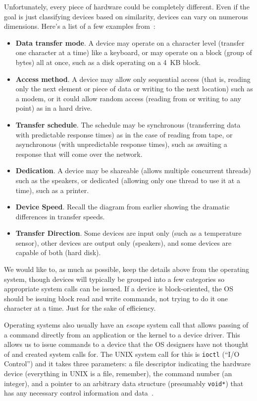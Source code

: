 Unfortunately, every piece of hardware could be completely different. Even if the goal is just classifying devices based on similarity, devices can vary on numerous dimensions. Here's a list of a few examples from~\cite{osc}:

\begin{itemize}
\item \textbf{Data transfer mode}. A device may operate on a character level (transfer one character at a time) like a keyboard, or may operate on a block (group of bytes) all at once, such as a disk operating on a 4~KB block.
\item \textbf{Access method}. A device may allow only sequential access (that is, reading only the next element or piece of data or writing to the next location) such as a modem, or it could allow random access (reading from or writing to any point) as in a hard drive.
\item \textbf{Transfer schedule}. The schedule may be synchronous (transferring data with predictable response times) as in the case of reading from tape, or asynchronous (with unpredictable response times), such as awaiting a response that will come over the network.
\item \textbf{Dedication}. A device may be shareable (allows multiple concurrent threads) such as the speakers, or dedicated (allowing only one thread to use it at a time), such as a printer.
\item \textbf{Device Speed}. Recall the diagram from earlier showing the dramatic differences in transfer speeds.
\item \textbf{Transfer Direction}. Some devices are input only (such as a temperature sensor), other devices are output only (speakers), and some devices are capable of both (hard disk).
\end{itemize}

We would like to, as much as possible, keep the details above from the operating system, though devices will typically be grouped into a few categories so appropriate system calls can be issued. If a device is block-oriented, the OS should be issuing block read and write commands, not trying to do it one character at a time. Just for the sake of efficiency.

Operating systems also usually have an \textit{escape} system call that allows passing of a command directly from an application or the kernel to a device driver. This allows us to issue commands to a device that the OS designers have not thought of and created system calls for. The UNIX system call for this is \texttt{ioctl} (``I/O Control'') and it takes three parameters: a file descriptor indicating the hardware device (everything in UNIX is a file, remember), the command number (an integer), and a pointer to an arbitrary data structure (presumably \texttt{void*}) that has any necessary control information and data~\cite{osc}.


